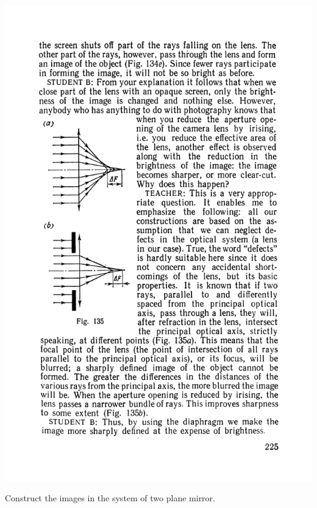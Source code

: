 \documentclass[a4paper,sfsidenotes]{tufte-book}
\begin{document}
\begin{marginfigure}%
\includegraphics[width=0.8\linewidth]{fig-135a}
\caption{Construct the images in the system of two plane mirror.}
\label{fig-135}
\end{marginfigure}
\end{document}
